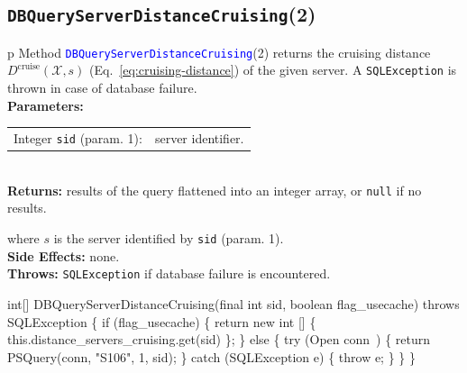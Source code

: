 \subsection{\texttt{DBQueryServerDistanceCruising}(2)}
\begin{tabular}{p{\textwidth}}
\toprule
{}
Method \textcolor{blue}{{\tt{}\protect{}DBQueryServerDistanceCruising}}(2) returns the
cruising distance $D^\textrm{cruise}(\mathcal{X},s)$
(Eq.~\ref{eq:cruising-distance}) of the given server.
A {\tt{}SQLException} is thrown in case of database failure.\\
\midrule
\textbf{Parameters:}\\
\begin{tabular}{lp{116mm}}
Integer {\tt{}sid} (param. 1):&server identifier.
\end{tabular}\\
\textbf{Returns:} results of the query flattened into an integer array,
or {\tt{}null} if no results.


where $s$ is the server identified by {\tt{}sid} (param. 1).\\
\textbf{Side Effects:} none.\\
\textbf{Throws:} {\tt{}SQLException} if database failure is encountered.\\
\bottomrule
\end{tabular}
\nwenddocs{}\endmoddef{}
int[] DBQueryServerDistanceCruising(final int sid, boolean flag_usecache) throws SQLException \{
  if (flag_usecache) \{
    return new int [] \{ this.distance_servers_cruising.get(sid) \};
  \} else \{
    try (\LA{}Open \code{}conn\edoc{}~{\nwtagstyle{}}\RA{}) \{
      return PSQuery(conn, "S106", 1, sid);
    \} catch (SQLException e) \{
      throw e;
    \}
  \}
\}
\eatline
{}\nwendcode{}\nwdocspar
